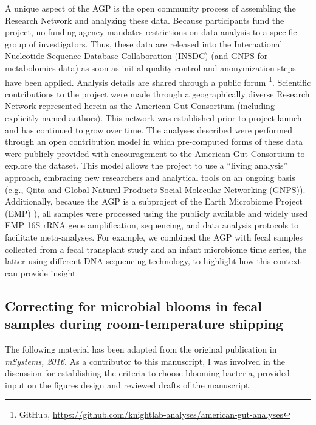 A unique aspect of the AGP is the open community process of assembling the Research
Network and analyzing these data. Because participants fund the project, no funding
agency mandates restrictions on data analysis to a specific group of investigators.
Thus, these data are released into the International Nucleotide Sequence Database
Collaboration (INSDC) (and GNPS for metabolomics data) as soon as initial quality
control and anonymization steps have been applied. Analysis details are shared
through a public forum \footnote{GitHub, \url{https://github.com/knightlab-analyses/american-gut-analyses}}.
Scientific contributions to the project were made through a geographically diverse
Research Network represented herein as the American Gut Consortium (including explicitly
named authors). This network was established prior to project launch and has continued
to grow over time. The analyses described were performed through an open contribution
model in which pre-computed forms of these data were publicly provided with encouragement
to the American Gut Consortium to explore the dataset. This model allows the project to
use a “living analysis” approach, embracing new researchers and analytical tools on an
ongoing basis (e.g., Qiita and Global Natural Products Social Molecular Networking (GNPS)).
Additionally, because the AGP is a subproject of the Earth Microbiome Project (EMP) \cite{Thompson2017}),
all samples were processed using the publicly available and widely used EMP 16S rRNA gene
amplification, sequencing, and data analysis protocols to facilitate meta-analyses. For
example, we combined the AGP with fecal samples collected from a fecal transplant
study and an infant microbiome time series, the latter using different DNA sequencing
technology, to highlight how this context can provide insight.


\subsection{Correcting for microbial blooms in fecal samples during room-temperature shipping}\label{subsection_bloom}
The following material has been adapted from the original publication in
\textsl{mSystems, 2016}. As a contributor to this manuscript, I was involved in
the discussion for establishing the criteria to choose blooming bacteria, provided
input on the figures design and reviewed drafts of the manuscript.

